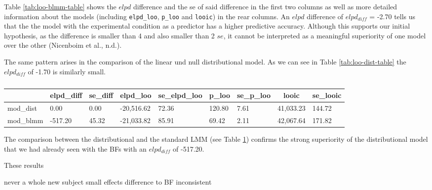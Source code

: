 \documentclass[
  doc,12pt,floatsintext]{apa7}
\begin{document}
Table \ref{tab:loo-blmm-table} shows the \(elpd\) difference and the se of said difference in the first two columns as well as more detailed information about the models (including \texttt{elpd\_loo}, \texttt{p\_loo} and \texttt{looic}) in the rear columns. An \(elpd\) difference of \(elpd_{diff}\) = -2.70 tells us that the the model with the experimental condition as a predictor has a higher predictive accuracy. Although this supports our initial hypothesis, as the difference is smaller than 4 and also smaller than 2 \(se\), it cannot be interpreted as a meaningful superiority of one model over the other (Nicenboim et al., n.d.).

The same pattern arises in the comparison of the linear und null distributional model. As we can see in Table \ref{tab:loo-dist-table} the \(elpd_{diff}\) of -1.70 is similarly small.

\begin{table}[tbp]

\begin{center}
\begin{threeparttable}

\caption{\label{tab:loo-blmm-dist-table}}

\begin{tabular}{lllllllll}
\toprule
 & \multicolumn{1}{c}{elpd\_diff} & \multicolumn{1}{c}{se\_diff} & \multicolumn{1}{c}{elpd\_loo} & \multicolumn{1}{c}{se\_elpd\_loo} & \multicolumn{1}{c}{p\_loo} & \multicolumn{1}{c}{se\_p\_loo} & \multicolumn{1}{c}{looic} & \multicolumn{1}{c}{se\_looic}\\
\midrule
mod\_dist & 0.00 & 0.00 & -20,516.62 & 72.36 & 120.80 & 7.61 & 41,033.23 & 144.72\\
mod\_blmm & -517.20 & 45.32 & -21,033.82 & 85.91 & 69.42 & 2.11 & 42,067.64 & 171.82\\
\bottomrule
\end{tabular}

\end{threeparttable}
\end{center}

\end{table}

The comparison between the distributional and the standard LMM (see Table \ref{tab:loo-blmm-dist-table}) confirms the strong superiority of the distributional model that we had already seen with the BFs with an \(elpd_{diff}\) of -517.20.

These results

never a whole new subject
small effects
difference to BF
inconsistent
\end{document}
